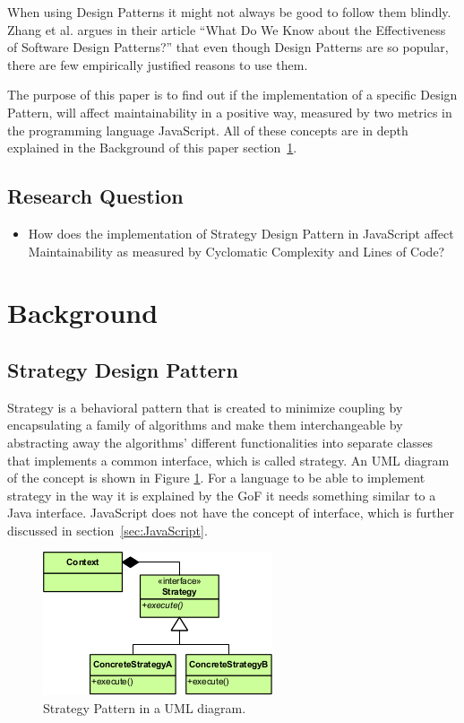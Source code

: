 \documentclass[conference, a4paper]{IEEEtran}
\begin{document}
When using Design Patterns it might not always be good to follow them blindly. Zhang et al. argues in their article ``What Do We Know about the Effectiveness of Software Design Patterns?'' that even though Design Patterns are so popular, there are few empirically justified reasons to use them.~\cite{bibitem:Zhang}

The purpose of this paper is to find out if the implementation of a specific Design Pattern, will affect maintainability in a positive way, measured by two metrics in the programming language JavaScript. All of these concepts are in depth explained in the Background of this paper section~\ref{sec:Background}.

\subsection{Research Question}
\begin{itemize}
	\item How does the implementation of Strategy Design Pattern in JavaScript affect Maintainability as measured by Cyclomatic Complexity and Lines of Code?
\end{itemize}

\section{Background}
\label{sec:Background}

\subsection{Strategy Design Pattern}
\label{sec:Strategy}

Strategy is a behavioral pattern that is created to minimize coupling by encapsulating a family of algorithms and make them interchangeable by abstracting away the algorithms' different functionalities into separate classes that implements a common interface, which is called strategy. An UML diagram of the concept is shown in Figure \ref{fig:Strategy}. For a language to be able to implement strategy in the way it is explained by the GoF it needs something similar to a Java interface. JavaScript does not have the concept of interface, which is further discussed in section~\ref{sec:JavaScript}.~\cite{bibitem:GoF}

\begin{figure}[ht!]
	\centering
	\includegraphics[scale=0.7]{Strategy_Pattern_in_UML.png}
	\caption{Strategy Pattern in a UML diagram.}
	\label{fig:Strategy}
\end{figure}
\end{document}
